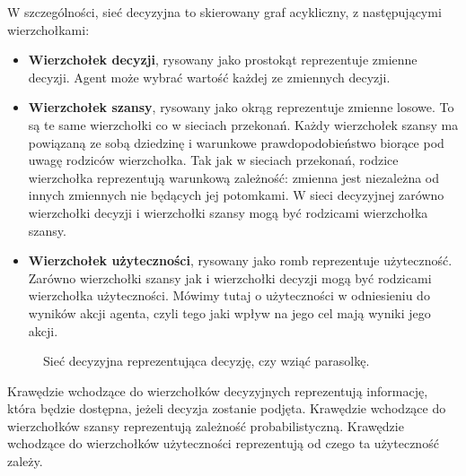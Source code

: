 \documentclass[a4paper, 12pt,twoside]{report}
\begin{document}
W szczególności, sieć decyzyjna to skierowany graf acykliczny, z następującymi
wierzchołkami:
\begin{itemize}
	\setlength\itemsep{-0.4em}
\item \textbf{Wierzchołek decyzji}, rysowany jako prostokąt reprezentuje
	zmienne decyzji. Agent może wybrać wartość każdej ze zmiennych decyzji.
\item \textbf{Wierzchołek szansy}, rysowany jako okrąg reprezentuje zmienne
	losowe. To są te same wierzchołki co w sieciach przekonań. Każdy
	wierzchołek szansy ma powiązaną ze sobą dziedzinę i warunkowe
	prawdopodobieństwo biorące pod uwagę rodziców wierzchołka. Tak jak w
	sieciach przekonań, rodzice wierzchołka reprezentują warunkową
	zależność: zmienna jest niezależna od innych zmiennych nie będących jej
	potomkami. W sieci decyzyjnej zarówno wierzchołki decyzji i wierzchołki
	szansy mogą być rodzicami wierzchołka szansy.
\item \textbf{Wierzchołek użyteczności}, rysowany jako romb reprezentuje
	użyteczność. Zarówno wierzchołki szansy jak i wierzchołki decyzji mogą
	być rodzicami wierzchołka użyteczności. Mówimy tutaj o użyteczności w
	odniesieniu do wyników akcji agenta, czyli tego jaki wpływ na jego cel
	mają wyniki jego akcji.
\end{itemize}
\begin{figure}[!htb]
\begin{center}
\caption{Sieć decyzyjna reprezentująca decyzję, czy wziąć parasolkę.}
\label{decision_network_umbrella}
\end{center}
\end{figure}
Krawędzie wchodzące do wierzchołków decyzyjnych reprezentują informację, która
będzie dostępna, jeżeli decyzja zostanie podjęta.
Krawędzie wchodzące do wierzchołków szansy reprezentują zależność
probabilistyczną.
Krawędzie wchodzące do wierzchołków użyteczności reprezentują od czego ta
użyteczność zależy.
\end{document}
